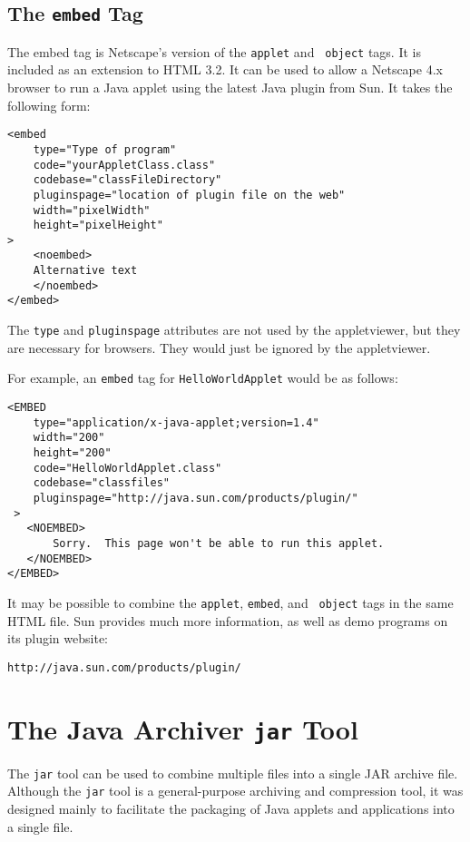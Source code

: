 \vspace{-6pt}\subsection*{The {\tt embed} Tag}
\noindent The embed tag is Netscape's version of the {\tt applet} and {\tt
object} tags.  It is included as an extension to HTML 3.2.  It can be used
to allow a Netscape 4.x browser to run a Java applet using the latest
Java plugin from Sun.  It takes the following form:

\begin{jjjlisting}
\begin{lstlisting}
<embed
    type="Type of program"
    code="yourAppletClass.class"
    codebase="classFileDirectory"
    pluginspage="location of plugin file on the web"
    width="pixelWidth"
    height="pixelHeight"
>
    <noembed>
    Alternative text
    </noembed>
</embed>
\end{lstlisting}
\end{jjjlisting}

\noindent The {\tt type} and {\tt pluginspage} attributes
are not used by the appletviewer, but they are necessary for
browsers.  They would just be ignored by the appletviewer.

For example, an {\tt embed} tag for {\tt HelloWorldApplet}
would be as follows:

\begin{jjjlisting}
\begin{lstlisting}
<EMBED
    type="application/x-java-applet;version=1.4"
    width="200"
    height="200"
    code="HelloWorldApplet.class"
    codebase="classfiles"
    pluginspage="http://java.sun.com/products/plugin/"
 >
   <NOEMBED>
       Sorry.  This page won't be able to run this applet.
   </NOEMBED>
</EMBED>
\end{lstlisting}
\end{jjjlisting}

It may be possible to combine the {\tt applet}, {\tt embed}, and {\tt
object} tags in the same HTML file.  Sun provides much more information,
as well as demo programs on its plugin website:

\begin{jjjlisting}
\begin{lstlisting}[commentstyle=\color{black}]
http://java.sun.com/products/plugin/
\end{lstlisting}
\end{jjjlisting}

\vspace{-6pt}\section*{The Java Archiver {\tt jar} Tool}
\label{the-java-archiver-tool}
\noindent The {\tt jar} tool can be used to combine multiple files into a single
JAR archive file.  Although the {\tt jar} tool is a general-purpose
archiving and compression tool, it was designed mainly to facilitate
the packaging of Java applets and applications into a single file.


